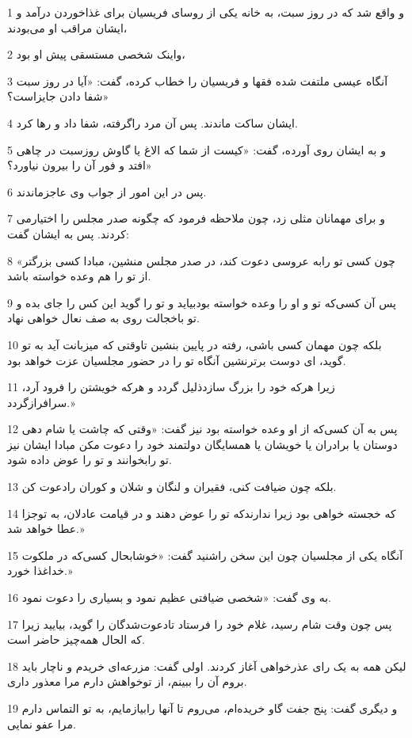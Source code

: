 \par 1 و واقع شد که در روز سبت، به خانه یکی از روسای فریسیان برای غذاخوردن درآمد و ایشان مراقب او می‌بودند،
\par 2 واینک شخصی مستسقی پیش او بود،
\par 3 آنگاه عیسی ملتفت شده فقها و فریسیان را خطاب کرده، گفت: «آیا در روز سبت شفا دادن جایزاست؟»
\par 4 ایشان ساکت ماندند. پس آن مرد راگرفته، شفا داد و رها کرد.
\par 5 و به ایشان روی آورده، گفت: «کیست از شما که الاغ یا گاوش روزسبت در چاهی افتد و فور آن را بیرون نیاورد؟»
\par 6 پس در این امور از جواب وی عاجزماندند.
\par 7 و برای مهمانان مثلی زد، چون ملاحظه فرمود که چگونه صدر مجلس را اختیارمی کردند. پس به ایشان گفت:
\par 8 «چون کسی تو رابه عروسی دعوت کند، در صدر مجلس منشین، مبادا کسی بزرگتر از تو را هم وعده خواسته باشد.
\par 9 پس آن کسی‌که تو و او را وعده خواسته بودبیاید و تو را گوید این کس را جای بده و تو باخجالت روی به صف نعال خواهی نهاد.
\par 10 بلکه چون مهمان کسی باشی، رفته در پایین بنشین تاوقتی که میزبانت آید به تو گوید، ای دوست برترنشین آنگاه تو را در حضور مجلسیان عزت خواهد بود.
\par 11 زیرا هر‌که خود را بزرگ سازدذلیل گردد و هر‌که خویشتن را فرود آرد، سرافرازگردد.»
\par 12 پس به آن کسی‌که از او وعده خواسته بود نیز گفت: «وقتی که چاشت یا شام دهی دوستان یا برادران یا خویشان یا همسایگان دولتمند خود را دعوت مکن مبادا ایشان نیز تو رابخوانند و تو را عوض داده شود.
\par 13 بلکه چون ضیافت کنی، فقیران و لنگان و شلان و کوران رادعوت کن.
\par 14 که خجسته خواهی بود زیرا ندارندکه تو را عوض دهند و در قیامت عادلان، به توجزا عطا خواهد شد.»
\par 15 آنگاه یکی از مجلسیان چون این سخن راشنید گفت: «خوشابحال کسی‌که در ملکوت خداغذا خورد.»
\par 16 به وی گفت: «شخصی ضیافتی عظیم نمود و بسیاری را دعوت نمود.
\par 17 پس چون وقت شام رسید، غلام خود را فرستاد تادعوت‌شدگان را گوید، بیایید زیرا که الحال همه‌چیز حاضر است.
\par 18 لیکن همه به یک رای عذرخواهی آغاز کردند. اولی گفت: مزرعه‌ای خریدم و ناچار باید بروم آن را ببینم، از توخواهش دارم مرا معذور داری.
\par 19 و دیگری گفت: پنج جفت گاو خریده‌ام، می‌روم تا آنها رابیازمایم، به تو التماس دارم مرا عفو نمایی.
